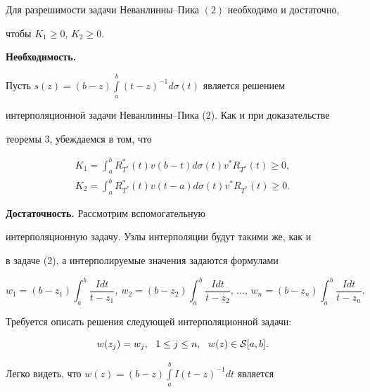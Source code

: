 \begin{thm}


Для разрешимости задачи Неванлинны--Пика $(2)$ необходимо и достаточно,


чтобы $K_1 \geq 0$, $K_2 \geq 0$.


\end{thm}





\begin{pf}


{\bf Необходимость.}


Пусть $s(z)=(b-z)\int\limits_a^b (t-z)^{-1}d \sigma (t)$ является решением


интерполяционной задачи Неванлинны--Пика (2). Как и при доказательстве


теоремы 3, убеждаемся в том, что


\begin{gather*}


K_1=\int_a^b R_{T^*}^*(t)v(b-t)d\sigma(t)v^{*}R_{T^*}(t) \geq 0,\\


%


K_2=\int_a^b R_{T^*}^*(t)v(t-a)d\sigma(t)v^{*}R_{T^*}(t) \geq 0.


\end{gather*}





{\bf Достаточность.} Рассмотрим вспомогательную


интерполяционную задачу. Узлы интерполяции будут такими же, как и


в задаче (2), а интерполируемые значения задаются формулами


$$


w_1=(b-z_1) \int_a^b \frac{Idt}{t-z_1},


\ w_2=(b-z_2) \int_a^b \frac{Idt}{t-z_2},


\,\dotsc ,


\,w_n=(b-z_n) \int_a^b \frac{Idt}{t-z_n}.


$$


Требуется описать решения следующей интерполяционной задачи:


\begin{equation}


w(z_j)=w_j, \ \ 1 \leq j \leq n, \ \ w(z) \in {\cal S}[a,b].


\end{equation}


Легко видеть, что $w(z)=(b-z) \int\limits_a^b I(t-z)^{-1}dt$ является



\end{pf}
